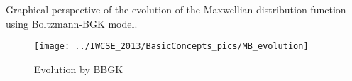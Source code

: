 \begin{frame}
Graphical perspective of the evolution of the Maxwellian distribution function using Boltzmann-BGK model.
\begin{figure}
	\centering
	\texttt{[image: ../IWCSE\_2013/BasicConcepts\_pics/MB\_evolution]}
	\caption{Evolution by BBGK}
	\label{fig:f_evolution}
\end{figure}
\end{frame}